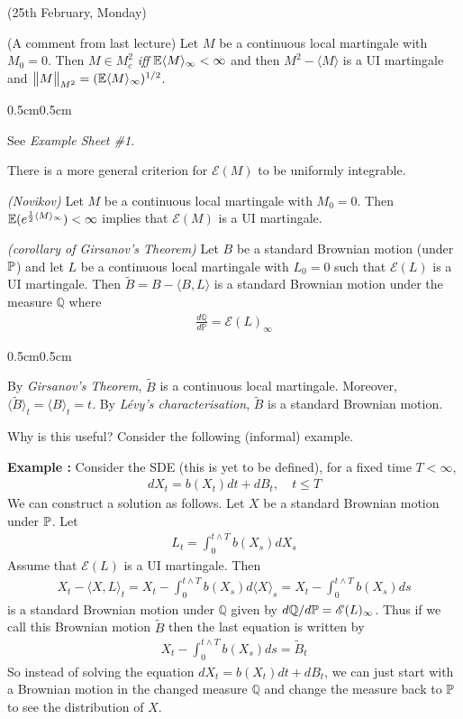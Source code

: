 \documentclass[12pt,a4paper]{article}
\newenvironment{proof}
{\begin{changemargin}{0.5cm}{0.5cm} 
	}%
	{\end{changemargin}
}
\newenvironment{p}
{\begin{proof} 
	}%
	{\end{proof}
}
\begin{document}
(25th February, Monday)
\s

(A comment from last lecture) \prop Let $M$ be a continuous local martingale with $M_0 =0$. Then $M \in M_c^2$ \emph{iff} $\mathbb{E} \langle M \rangle_{\infty} < \infty$ and then $M^2 - \langle M \rangle$ is a UI martingale and $\bigl\lVert M\bigr\rVert_{M^2} = (\mathbb{E} \langle M \rangle_{\infty})^{1/2}$.
\begin{p}
\pf See \emph{Example Sheet \#1}.
\end{p}
\s

There is a more general criterion for $\mathscr{E}(M)$ to be uniformly integrable.
\s

\thm \emph{(Novikov)} Let $M$ be a continuous local martingale with $M_0 = 0$. Then $\mathbb{E} (e^{\frac{1}{2} \langle M \rangle_{\infty}})< \infty$ implies that $\mathscr{E}(M)$ is a UI martingale.
\s

\corr \emph{(corollary of Girsanov's Theorem)} Let $B$ be a standard Brownian motion (under $\mathbb{P}$) and let $L$ be a continuous local martingale with $L_0 = 0$ such that $\mathscr{E}(L)$ is a UI martingale. Then $\tilde{B} = B- \langle B, L \rangle$ is a standard Brownian motion under the measure $\mathbb{Q}$ where
\begin{align*}
\frac{d\mathbb{Q}}{d\mathbb{P}} = \mathscr{E}(L)_{\infty}
\end{align*}
\begin{p}
\pf By \emph{Girsanov's Theorem}, $\tilde{B}$ is a continuous local martingale. Moreover, $\langle \tilde{B}\rangle_t = \langle B\rangle_t =t$. By \emph{L\'{e}vy's characterisation}, $\tilde{B}$ is a standard Brownian motion.

\eop
\end{p}
\s

Why is this useful? Consider the following (informal) example.
\s

\textbf{Example :} Consider the SDE (this is yet to be defined), for a fixed time $T< \infty$,
\begin{align*}
dX_t =b(X_t) dt + dB_t, \quad t\leq T
\end{align*}
We can construct a solution as follows. Let $X$ be a standard Brownian motion under $\mathbb{P}$. Let
\begin{align*}
L_t = \int_0^{t\wedge T} b(X_s) dX_s
\end{align*}
Assume that $\mathscr{E}(L)$ is a UI martingale. Then
\begin{align*}
X_t - \langle X, L\rangle_t = X_t - \int_0^{t\wedge T} b(X_s) d\langle X \rangle_s = X_t - \int_0^{t\wedge T} b(X_s) ds
\end{align*}
is a standard Brownian motion under $\mathbb{Q}$ given by $d\mathbb{Q} / d\mathbb{P} = \mathscr{E}(L)_{\infty}$. Thus if we call this Brownian motion $\tilde{B}$ then the last equation is written by
\begin{align*}
X_t - \int_0^{t\wedge T}b(X_s) ds = \tilde{B}_t
\end{align*}
So instead of solving the equation $dX_t = b(X_t) dt + dB_t$, we can just start with a Brownian motion in the changed measure $\mathbb{Q}$ and change the measure back to $\mathbb{P}$ to see the distribution of $X$.
\end{document}
